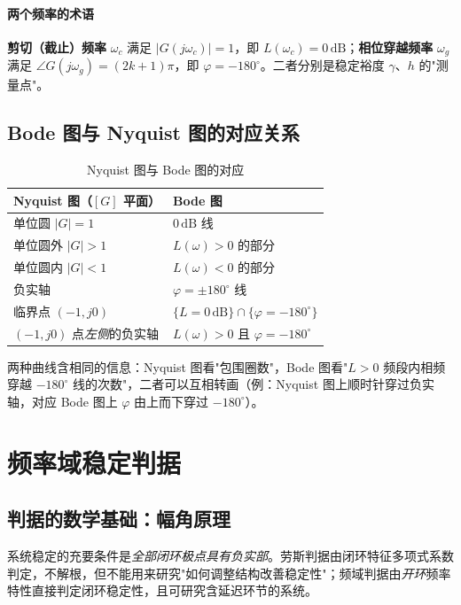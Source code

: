 \paragraph{两个频率的术语}
\textbf{剪切（截止）频率} $\omega_c$ 满足 $|G(j\omega_c)|=1$，即 $L(\omega_c)=0\,\mathrm{dB}$；\textbf{相位穿越频率} $\omega_g$ 满足 $\angle G(j\omega_g)=(2k+1)\pi$，即 $\varphi=-180^\circ$。二者分别是稳定裕度 $\gamma$、$h$ 的"测量点"。

\subsection{Bode 图与 Nyquist 图的对应关系}
\begin{table}[htbp]
\centering
\caption{Nyquist 图与 Bode 图的对应}\label{tab:bodenyq}
\begin{tabular}{ll}
\toprule
Nyquist 图（$[G]$ 平面） & Bode 图 \\
\midrule
单位圆 $|G|=1$ & $0\,\mathrm{dB}$ 线 \\
单位圆外 $|G|>1$ & $L(\omega)>0$ 的部分 \\
单位圆内 $|G|<1$ & $L(\omega)<0$ 的部分 \\
负实轴 & $\varphi=\pm180^\circ$ 线 \\
临界点 $(-1,j0)$ & $\{L=0\,\mathrm{dB}\}\cap\{\varphi=-180^\circ\}$ \\
$(-1,j0)$ 点\emph{左侧}的负实轴 & $L(\omega)>0$ 且 $\varphi=-180^\circ$ \\
\bottomrule
\end{tabular}
\end{table}
两种曲线含相同的信息：Nyquist 图看"包围圈数"，Bode 图看"$L>0$ 频段内相频穿越 $-180^\circ$ 线的次数"，二者可以互相转画（例：Nyquist 图上顺时针穿过负实轴，对应 Bode 图上 $\varphi$ 由上而下穿过 $-180^\circ$）。

\bigskip

\section{频率域稳定判据}

\subsection{判据的数学基础：幅角原理}
系统稳定的充要条件是\emph{全部闭环极点具有负实部}。劳斯判据由闭环特征多项式系数判定，不解根，但不能用来研究"如何调整结构改善稳定性"；频域判据由\emph{开环}频率特性直接判定闭环稳定性，且可研究含延迟环节的系统。

